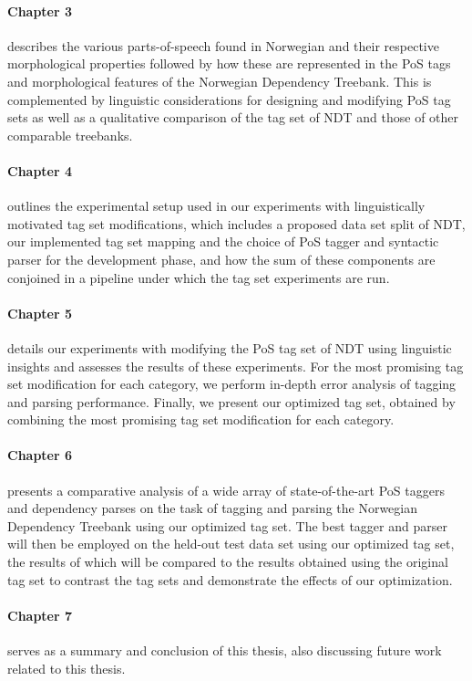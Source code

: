 \documentclass[a4paper,12pt,english]{book}
\begin{document}
\paragraph{Chapter 3} describes the various parts-of-speech found in Norwegian
and their respective morphological properties followed by how these are
represented in the PoS tags and morphological features of the Norwegian
Dependency Treebank.  This is complemented by linguistic considerations for
designing and modifying PoS tag sets as well as a qualitative comparison of the
tag set of NDT and those of other comparable treebanks.

\paragraph{Chapter 4} outlines the experimental setup used in our experiments
with linguistically motivated tag set modifications, which includes a proposed
data set split of NDT, our implemented tag set mapping and the choice of PoS
tagger and syntactic parser for the development phase, and how the sum of these
components are conjoined in a pipeline under which the tag set experiments are
run.

\paragraph{Chapter 5} details our experiments with modifying the PoS tag set of
NDT using linguistic insights
and assesses the results of these experiments. For the most
promising tag set modification for each category, we perform in-depth error
analysis of tagging and parsing performance. Finally, we present our optimized
tag set, obtained by combining the most promising tag set modification for each
category.

\paragraph{Chapter 6} presents a comparative analysis of a wide array of
state-of-the-art PoS taggers and dependency parses on the task of tagging and
parsing the Norwegian Dependency Treebank using our optimized tag set. The best
tagger and parser will then be employed on the held-out test data set using our
optimized tag set, the results of which will be compared to the results
obtained using the original tag set to contrast the tag sets and demonstrate
the effects of our optimization.

\paragraph{Chapter 7} serves as a summary and conclusion of this thesis, also
discussing future work related to this thesis.
\end{document}
